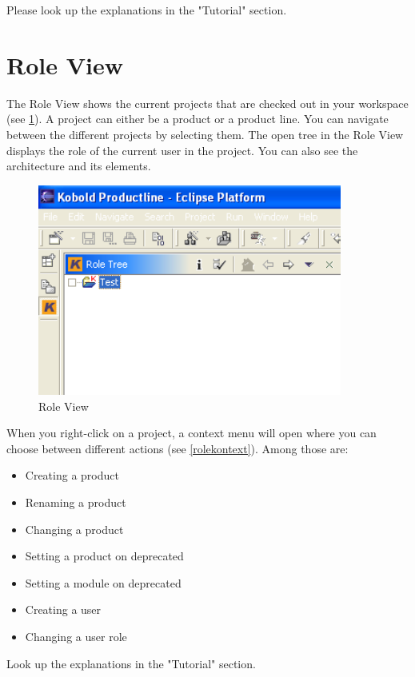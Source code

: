 Please look up the explanations in the "Tutorial" section.

\section{Role View}

The Role View shows the current projects that are checked out in your workspace 
(see \ref{roletree}).
A project can either be a product or a product line. You can navigate between the 
different projects by selecting them. The open tree in the Role View displays the
role of the current user in the project. You can also see the architecture and its 
elements.

\begin{figure}[h!]
\begin{center}
\includegraphics[width=10cm]{roletree.png}
   \caption{Role View}
\label{roletree}
\end{center}
\end{figure}\par

When you right-click on a project, a context menu will open where you can choose 
between different actions (see \ref{rolekontext}). Among those are:

\begin{itemize}
	\item Creating a product
	\item Renaming a product
	\item Changing a product
	\item Setting a product on deprecated
	\item Setting a module on deprecated
	\item Creating a user
	\item Changing a user role
\end{itemize}
Look up the explanations in the "Tutorial" section.

